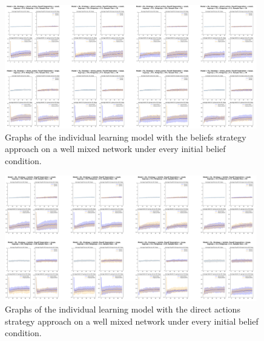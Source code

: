 \documentclass[]{llncs}
\begin{document}
\begin{figure}
\centering
\includegraphics[width=11cm]{images/individual_wellmixed1}
\caption{\label{individual_wellmixed1} Graphs of the individual learning model with the beliefs strategy approach on a well mixed network under every initial belief condition.}
\end{figure}
\begin{figure}
\centering
\includegraphics[width=11cm]{images/individual_wellmixed2}
\caption{\label{individual_wellmixed2} Graphs of the individual learning model with the direct actions strategy approach on a well mixed network under every initial belief condition.}
\end{figure}
\end{document}

